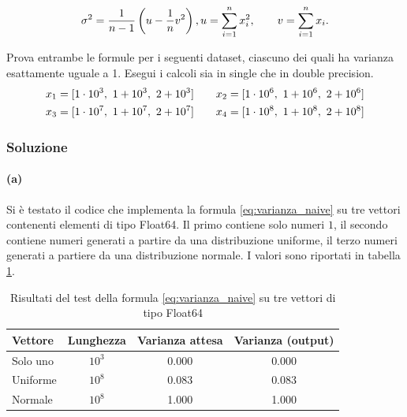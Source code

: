 \documentclass[letterpaper, 12pt]{article}
\numberwithin{equation}{section}    %
\begin{document}
\begin{equation}
    \sigma^2 = \frac{1}{n-1} \left( u - \frac{1}{n}v^2 \right),\\
    u  = \sum_{i=1}^n x_i^2, 
    \qquad
    v = \sum_{i=1}^n x_i.  
    \label{eq:varianza_eff}  
\end{equation}

Prova entrambe le formule per i seguenti dataset, ciascuno dei quali ha varianza esattamente uguale a 1. 
Esegui i calcoli sia in single che in double precision. 
\begin{align*}
    x_1 &= [ 1\cdot 10^3,\ 1+10^3,\ 2+10^3 ] \qquad
    x_2 = [ 1\cdot 10^6,\ 1+10^6,\ 2+10^6 ] \notag \\
    x_3 &= [ 1\cdot 10^7,\ 1+10^7,\ 2+10^7 ] \qquad
    x_4 = [ 1\cdot 10^8,\ 1+10^8,\ 2+10^8 ]
\end{align*}


\subsubsection{Soluzione}
\paragraph{(a)}Si è testato il codice che implementa la formula \ref{eq:varianza_naive} su tre vettori contenenti
elementi di tipo Float64. Il primo contiene solo numeri $1$, il secondo contiene numeri generati a partire 
da una distribuzione uniforme, il terzo numeri generati a partiere da una distribuzione normale. I valori sono 
riportati in tabella \ref{tab:varianza_test}.

\begin{table}[!ht]
\centering
\caption{Risultati del test della formula \ref{eq:varianza_naive} su tre vettori di tipo Float64}
\label{tab:varianza_test}
\begin{tabular}{|l|c|c|c|}
\hline
\textbf{Vettore} & \textbf{Lunghezza}   & \textbf{Varianza attesa} & \textbf{Varianza (output)} \\
\hline
Solo uno         & $10^3$               & 0.000                    & 0.000                       \\
Uniforme         & $10^8$               & 0.083                    & 0.083                       \\
Normale          & $10^8$               & 1.000                    & 1.000                       \\
\hline
\end{tabular}
\end{table}
\end{document}
